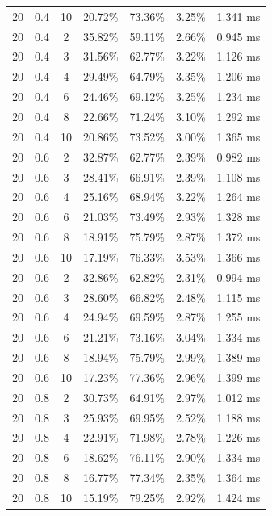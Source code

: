 \documentclass[11pt,a4paper]{article}
\begin{document}
\begin{longtable}{ccccccc}
        20 & 0.4 & 10 & 20.72\% & 73.36\% & 3.25\% & 1.341 ms \\
        20 & 0.4 & 2 & 35.82\% & 59.11\% & 2.66\% & 0.945 ms \\
        20 & 0.4 & 3 & 31.56\% & 62.77\% & 3.22\% & 1.126 ms \\
        20 & 0.4 & 4 & 29.49\% & 64.79\% & 3.35\% & 1.206 ms \\
        20 & 0.4 & 6 & 24.46\% & 69.12\% & 3.25\% & 1.234 ms \\
        20 & 0.4 & 8 & 22.66\% & 71.24\% & 3.10\% & 1.292 ms \\
        20 & 0.4 & 10 & 20.86\% & 73.52\% & 3.00\% & 1.365 ms \\
        \midrule
        20 & 0.6 & 2 & 32.87\% & 62.77\% & 2.39\% & 0.982 ms \\
        20 & 0.6 & 3 & 28.41\% & 66.91\% & 2.39\% & 1.108 ms \\
        20 & 0.6 & 4 & 25.16\% & 68.94\% & 3.22\% & 1.264 ms \\
        20 & 0.6 & 6 & 21.03\% & 73.49\% & 2.93\% & 1.328 ms \\
        20 & 0.6 & 8 & 18.91\% & 75.79\% & 2.87\% & 1.372 ms \\
        20 & 0.6 & 10 & 17.19\% & 76.33\% & 3.53\% & 1.366 ms \\
        20 & 0.6 & 2 & 32.86\% & 62.82\% & 2.31\% & 0.994 ms \\
        20 & 0.6 & 3 & 28.60\% & 66.82\% & 2.48\% & 1.115 ms \\
        20 & 0.6 & 4 & 24.94\% & 69.59\% & 2.87\% & 1.255 ms \\
        20 & 0.6 & 6 & 21.21\% & 73.16\% & 3.04\% & 1.334 ms \\
        20 & 0.6 & 8 & 18.94\% & 75.79\% & 2.99\% & 1.389 ms \\
        20 & 0.6 & 10 & 17.23\% & 77.36\% & 2.96\% & 1.399 ms \\
        \midrule
        20 & 0.8 & 2 & 30.73\% & 64.91\% & 2.97\% & 1.012 ms \\
        20 & 0.8 & 3 & 25.93\% & 69.95\% & 2.52\% & 1.188 ms \\
        20 & 0.8 & 4 & 22.91\% & 71.98\% & 2.78\% & 1.226 ms \\
        20 & 0.8 & 6 & 18.62\% & 76.11\% & 2.90\% & 1.334 ms \\
        20 & 0.8 & 8 & 16.77\% & 77.34\% & 2.35\% & 1.364 ms \\
        20 & 0.8 & 10 & 15.19\% & 79.25\% & 2.92\% & 1.424 ms \\

\end{longtable}
\end{document}

